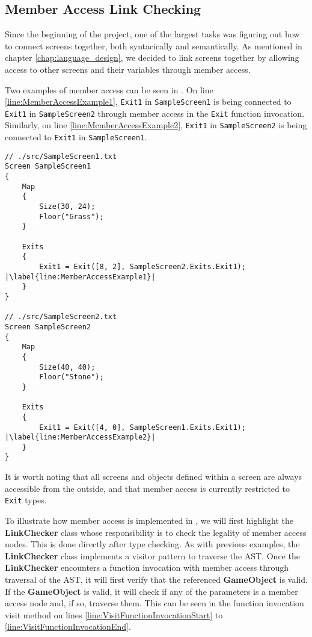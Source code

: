 \subsection*{Member Access Link Checking} \label{sec:Linker}
Since the beginning of the project, one of the largest tasks was figuring out how to connect screens together, both syntacically and semantically. 
As mentioned in chapter \ref{chap:language_design}, we decided to link screens together by allowing access to other screens and their variables through member access. 


Two examples of member access can be seen in . 
On line \ref{line:MemberAccessExample1}, \texttt{Exit1} in \texttt{SampleScreen1} is being connected to \texttt{Exit1} in \texttt{SampleScreen2} through member access in the \texttt{Exit} function invocation.
Similarly, on line \ref{line:MemberAccessExample2}, \texttt{Exit1} in \texttt{SampleScreen2} is being connected to \texttt{Exit1} in \texttt{SampleScreen1}.

\begin{lstlisting}[language=CSharp, caption={\dazel{} source code example of member access.}, label={lst:LinkingExample},escapechar=|]
// ./src/SampleScreen1.txt
Screen SampleScreen1 
{
	Map 
	{
		Size(30, 24);
		Floor("Grass");
	}
	
	Exits 
	{
		Exit1 = Exit([8, 2], SampleScreen2.Exits.Exit1); |\label{line:MemberAccessExample1}|
	}
}

// ./src/SampleScreen2.txt
Screen SampleScreen2
{
	Map 
	{
		Size(40, 40);
		Floor("Stone");
	}
	
	Exits 
	{
		Exit1 = Exit([4, 0], SampleScreen1.Exits.Exit1); |\label{line:MemberAccessExample2}|
	}
}
\end{lstlisting}

It is worth noting that all screens and objects defined within a screen are always accessible from the outside, and that member access is currently restricted to \texttt{Exit} types.


To illustrate how member access is implemented in \dazel{}, we will first highlight the \textbf{LinkChecker} class whose responsibility is to check the legality of member access nodes. This is done directly after type checking.
As with previous examples, the \textbf{LinkChecker} class implements a visitor pattern to traverse the AST.
Once the \textbf{LinkChecker} encounters a function invocation with member access through traversal of the AST, it will first verify that the referenced \textbf{GameObject} is valid. 
If the \textbf{GameObject} is valid, it will check if any of the parameters is a member access node and, if so, traverse them. This can be seen in the function invocation visit method on lines \ref{line:VisitFunctionInvocationStart} to \ref{line:VisitFunctionInvocationEnd}. 

